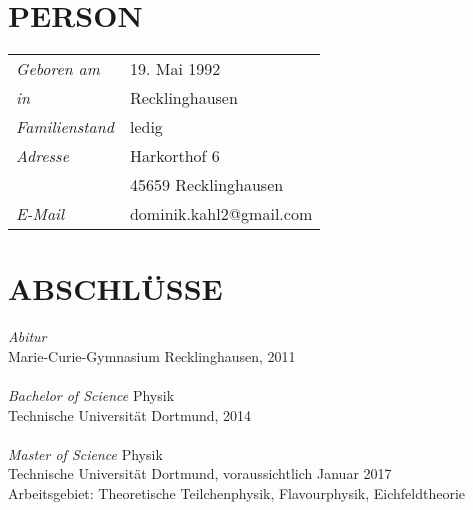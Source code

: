 \documentclass[margin,12pt]{res} %
\begin{document}
\hspace{0.2in}
\begin{resume}

 
\section{PERSON}  
\begin{tabular}{ll}
{\sl Geboren am}& 19. Mai 1992 \\
{\sl in}& Recklinghausen		  \\
{\sl Familienstand}& ledig		\\
{\sl Adresse}& Harkorthof 6 \\ &45659 Recklinghausen \\
{\sl E-Mail} &dominik.kahl2@gmail.com
\end{tabular}

\section{ABSCHLÜSSE}
{\sl Abitur} \\
Marie-Curie-Gymnasium Recklinghausen, 2011\\\\
{\sl Bachelor of Science} Physik \\
Technische Universität Dortmund, 2014 
\\\\
{\sl Master of Science} Physik \\
Technische Universität Dortmund, voraussichtlich Januar 2017\\
Arbeitsgebiet: Theoretische Teilchenphysik, Flavourphysik, Eichfeldtheorie


\end{resume}
\end{document}
